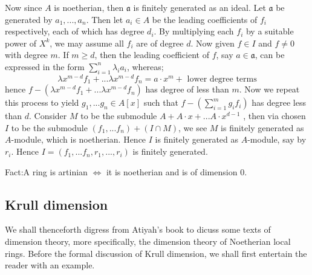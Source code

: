 \documentclass[12pt]{article}
\theoremstyle{definition}
\theoremstyle{plain}
\begin{document}
\medskip
Now since $A$ is noetherian, then $\mathfrak{a}$ is finitely generated as an ideal. Let $\mathfrak{a}$ be generated by $a_1, ..., a_n$. Then let $a_i\in A$ be the leading coefficients of $f_i$ respectively, each of which has degree $d_i$. By multiplying each $f_i$ by a suitable power of $X^k$, we may assume all $f_i$ are of degree $d$. Now given $f\in I$ and $f\neq 0$ with degree $m$. If $m\geq d$, then the leading coefficient of $f$, say $a\in \mathfrak{a}$, can be expressed in the form $\sum_{i=1}^n \lambda_ia_i$, whereas;
\[\lambda x^{m-d}f_1+...\lambda x^{m-d}f_n=a\cdot x^m+ \text{ lower degree terms}\]
hence $f-(\lambda x^{m-d}f_1+...\lambda x^{m-d}f_n)$ has degree of less than $m$. Now we repeat this process to yield $g_1, ...g_n\in A[x]$ such that $f-(\sum_{i=1}^mg_if_i)$ has degree less than $d$. Consider $M$ to be the submodule $A+A\cdot x+...A\cdot x^{d-1}$ , then via chosen  $I$ to be the submodule $(f_1, ...f_n)+(I\cap M)$, we see $M$ is finitely generated as $A$-module, which is noetherian. Hence $I$ is finitely generated as $A$-module, say by $r_i$. Hence $I=(f_1, ...f_n, r_1, ..., r_i)$ is finitely generated. \qedhere
\begin{paragraph}
  {Fact:}A ring is artinian $\iff$ it is noetherian and is of dimension $0$.
\end{paragraph}

\subsection{Krull dimension}
We shall thenceforth digress from Atiyah's book to dicuss some texts of dimension theory, more specifically, the dimension theory of Noetherian local rings. Before the formal discussion of Krull dimension, we shall first entertain the reader with an example.
\end{document}
